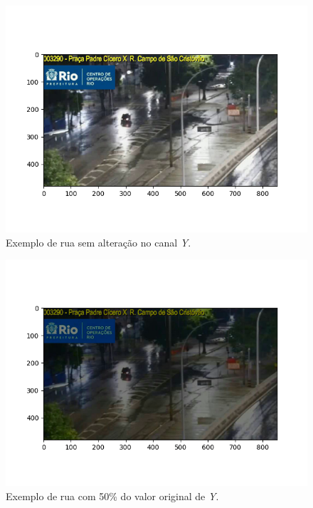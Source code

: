 \begin{figure}[htb]
    \centerline{\includegraphics[width=1\linewidth]{images/metodologia/samplebright.png}}
    \caption{Exemplo de rua sem alteração no canal \textit{Y}.}
    \label{fig:samplebright}
\end{figure}
\begin{figure}[htb]
    \centerline{\includegraphics[width=1\linewidth]{images/metodologia/samplebright_half.png}}
    \caption{Exemplo de rua com 50\% do valor original de \textit{Y}.}
    \label{fig:samplebright_half}
\end{figure}


